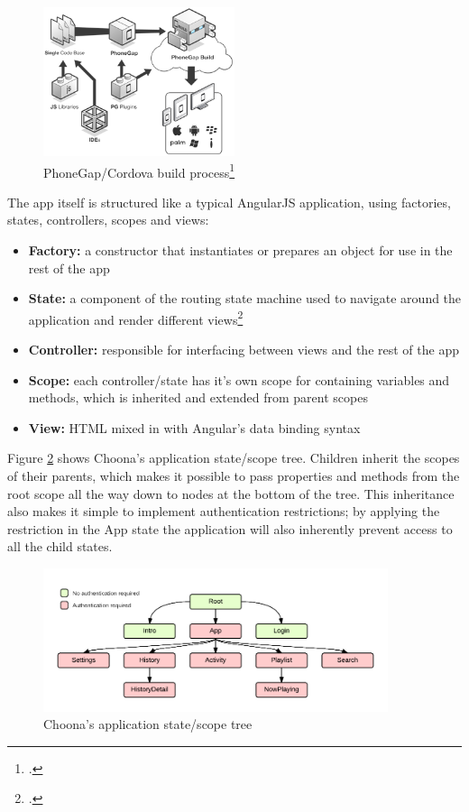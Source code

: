 \begin{figure}[h!]
  \centering
  \includegraphics[width=0.5\textwidth]{./img/phonegap.png}
  \caption{PhoneGap/Cordova build process\footcite{phonegap}}
  \label{fig:phonegap}
\end{figure}

The app itself is structured like a typical AngularJS application, using factories, states, controllers, scopes and views:

\begin{itemize}
  \item \textbf{Factory:} a constructor that instantiates or prepares an object for use in the rest of the app
  \item \textbf{State:} a component of the routing state machine used to navigate around the application and render different views\footcite{router}
  \item \textbf{Controller:} responsible for interfacing between views and the rest of the app
  \item \textbf{Scope:} each controller/state has it's own scope for containing variables and methods, which is inherited and extended from parent scopes
  \item \textbf{View:} HTML mixed in with Angular's data binding syntax
\end{itemize}

Figure \ref{fig:state} shows Choona's application state/scope tree. Children inherit the scopes of their parents, which makes it possible to pass properties and methods from the root scope all the way down to nodes at the bottom of the tree. This inheritance also makes it simple to implement authentication restrictions; by applying the restriction in the App state the application will also inherently prevent access to all the child states.

\begin{figure}[h!]
  \centering
  \includegraphics[width=0.9\textwidth]{./img/state.png}
  \caption{Choona's application state/scope tree}
  \label{fig:state}
\end{figure}

